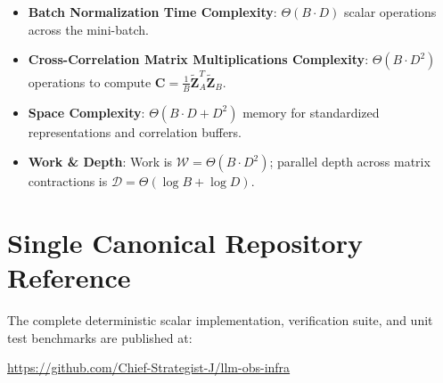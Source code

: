 \documentclass[11pt,a4paper]{article}
\theoremstyle{definition}
\begin{document}
\begin{itemize}
    \item \textbf{Batch Normalization Time Complexity}: $\Theta(B \cdot D)$ scalar operations across the mini-batch.
    \item \textbf{Cross-Correlation Matrix Multiplications Complexity}: $\Theta(B \cdot D^2)$ operations to compute $\mathbf{C} = \frac{1}{B}\tilde{\mathbf{Z}}_A^T \tilde{\mathbf{Z}}_B$.
    \item \textbf{Space Complexity}: $\Theta(B \cdot D + D^2)$ memory for standardized representations and correlation buffers.
    \item \textbf{Work \& Depth}: Work is $\mathcal{W} = \Theta(B \cdot D^2)$; parallel depth across matrix contractions is $\mathcal{D} = \Theta(\log B + \log D)$.
\end{itemize}

\section{Single Canonical Repository Reference}

The complete deterministic scalar implementation, verification suite, and unit test benchmarks are published at:
\begin{center}
\url{https://github.com/Chief-Strategist-J/llm-obs-infra}
\end{center}
\end{document}
